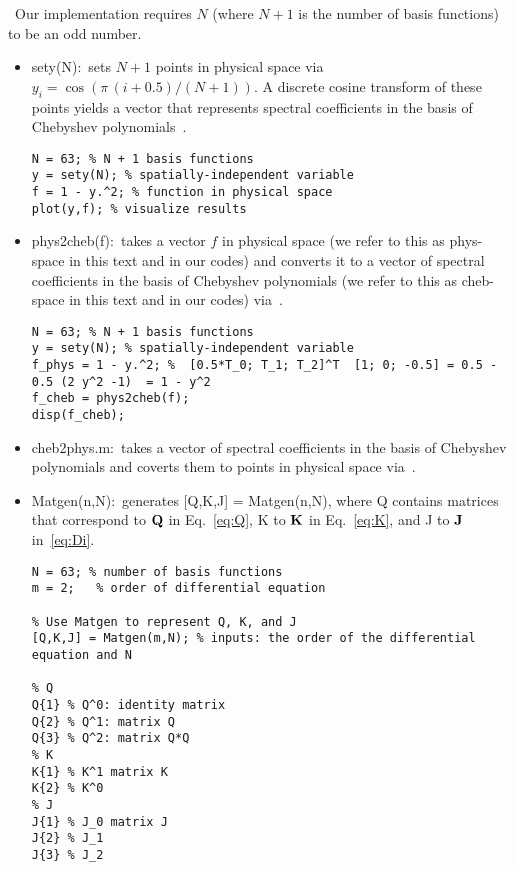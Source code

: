 \documentclass[%
secnumarabic,%
 amssymb, amsmath,%
 aps,prf,superscriptaddress,longbibliography
frontmatterverbose,
]{revtex4-2}
\begin{document}
	\vspace*{1ex}
~Our implementation requires $N$ (where $N+1$ is the number of basis functions) to be an odd number.
\begin{itemize}
  \item \textsf{sety(N)}:~sets $N+1$ points in physical space via $y_i = \cos (\pi \,(i + 0.5) / (N + 1))$. A discrete cosine transform of these points yields a vector that represents spectral coefficients in the basis of Chebyshev polynomials~\cite[Eq.~12.4.16-17]{NumRecipes}.
\begin{lstlisting}
N = 63; % N + 1 basis functions
y = sety(N); % spatially-independent variable
f = 1 - y.^2; % function in physical space
plot(y,f); % visualize results
\end{lstlisting}  

\item \textsf{phys2cheb(f)}:~takes a vector $f$ in physical space (we refer to this as phys-space in this text and in our codes) and converts it to a vector of spectral coefficients in the basis of Chebyshev polynomials (we refer to this as cheb-space in this text and in our codes) via~\cite[Eq.~12.4.16-17]{NumRecipes}.
\begin{lstlisting}
N = 63; % N + 1 basis functions
y = sety(N); % spatially-independent variable
f_phys = 1 - y.^2; %  [0.5*T_0; T_1; T_2]^T  [1; 0; -0.5] = 0.5 - 0.5 (2 y^2 -1)  = 1 - y^2
f_cheb = phys2cheb(f);
disp(f_cheb);
\end{lstlisting}
  
  \item \textsf{cheb2phys.m}:~takes a vector of spectral coefficients in the basis of Chebyshev polynomials and coverts them to points in physical space via~\cite[Eq.~12.4.16-17]{NumRecipes}.
  
  \item \textsf{Matgen(n,N)}:~generates \textsf{[Q,K,J] = Matgen(n,N)}, where \textsf{Q} contains matrices that correspond to $\mathbf{Q}$ in Eq.~\eqref{eq:Q}, \textsf{K} to $\mathbf{K}$ in Eq.~\eqref{eq:K}, and \textsf{J} to $\mathbf{J}$ in~\eqref{eq:Di}.
\begin{lstlisting}
N = 63; % number of basis functions
m = 2;   % order of differential equation

% Use Matgen to represent Q, K, and J
[Q,K,J] = Matgen(m,N); % inputs: the order of the differential equation and N

% Q
Q{1} % Q^0: identity matrix
Q{2} % Q^1: matrix Q
Q{3} % Q^2: matrix Q*Q
% K
K{1} % K^1 matrix K
K{2} % K^0
% J
J{1} % J_0 matrix J
J{2} % J_1
J{3} % J_2
\end{lstlisting}
   

\end{itemize}
\end{document}
